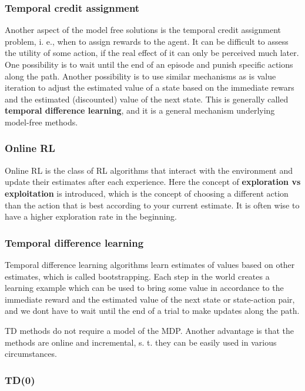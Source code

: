 \subsubsection{Temporal credit assignment}

Another aspect of the model free solutions is the temporal credit assignment problem, i. e., when to assign rewards to the agent. It can be difficult to assess the utility of some action, if the real effect of it can only be perceived much later. One possibility is to wait until the end of an episode and punish specific actions along the path. Another possibility is to use similar mechanisms as is value iteration to adjust the estimated value of a state based on the immediate rewars and the estimated (discounted) value of the next state. This is generally called \textbf{temporal difference learning}, and it is a general mechanism underlying model-free methods.


\subsubsection{Online RL}

Online RL is the class of RL algorithms that interact with the environment and update their estimates after each experience. Here the concept of \textbf{exploration vs exploitation} is introduced, which is the concept of choosing a different action than the action that is best according to your current estimate. It is often wise to have a higher exploration rate in the beginning.

\subsubsection{Temporal difference learning}

Temporal difference learning algorithms learn estimates of values based on other estimates, which is called bootstrapping. Each step in the world creates a learning example which can be used to bring some value in accordance to the immediate reward and the estimated value of the next state or state-action pair, and we dont have to wait until the end of a trial to make updates along the path.

TD methods do not require a model of the MDP. Another advantage is that the methods are online and incremental, s. t. they can be easily used in various circumstances.

\subsubsection{TD(0)}

